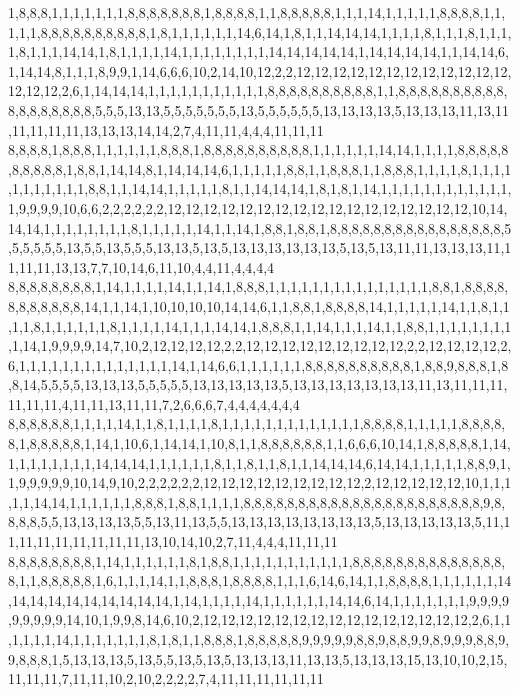 1,8,8,8,1,1,1,1,1,1,1,8,8,8,8,8,8,8,1,8,8,8,8,1,1,8,8,8,8,8,1,1,1,14,1,1,1,1,1,8,8,8,8,1,1,1,1,1,8,8,8,8,8,8,8,8,8,8,1,8,1,1,1,1,1,1,14,6,14,1,8,1,1,14,14,14,1,1,1,1,8,1,1,1,8,1,1,1,1,8,1,1,1,14,14,1,8,1,1,1,1,14,1,1,1,1,1,1,1,1,14,14,14,14,14,1,14,14,14,14,1,1,14,14,6,1,14,14,8,1,1,1,8,9,9,1,14,6,6,6,10,2,14,10,12,2,2,12,12,12,12,12,12,12,12,12,12,12,12,12,12,12,2,6,1,14,14,14,1,1,1,1,1,1,1,1,1,1,1,8,8,8,8,8,8,8,8,8,8,1,1,8,8,8,8,8,8,8,8,8,8,8,8,8,8,8,8,8,8,5,5,5,13,13,5,5,5,5,5,5,5,13,5,5,5,5,5,5,13,13,13,13,5,13,13,13,11,13,11,11,11,11,11,13,13,13,14,14,2,7,4,11,11,4,4,4,11,11,11
8,8,8,8,1,8,8,8,1,1,1,1,1,1,8,8,8,1,8,8,8,8,8,8,8,8,8,8,1,1,1,1,1,1,14,14,1,1,1,1,8,8,8,8,8,8,8,8,8,8,1,8,8,1,14,14,8,1,14,14,14,6,1,1,1,1,1,8,8,1,1,8,8,8,1,1,8,8,8,1,1,1,1,8,1,1,1,1,1,1,1,1,1,1,1,8,8,1,1,14,14,1,1,1,1,1,8,1,1,14,14,14,1,8,1,8,1,14,1,1,1,1,1,1,1,1,1,1,1,1,1,9,9,9,9,10,6,6,2,2,2,2,2,2,12,12,12,12,12,12,12,12,12,12,12,12,12,12,12,12,12,10,14,14,14,1,1,1,1,1,1,1,1,8,1,1,1,1,1,14,1,1,14,1,8,8,1,8,8,1,8,8,8,8,8,8,8,8,8,8,8,8,8,8,8,8,5,5,5,5,5,5,13,5,5,13,5,5,5,13,13,5,13,5,13,13,13,13,13,13,5,13,5,13,11,11,13,13,13,11,11,11,11,13,13,7,7,10,14,6,11,10,4,4,11,4,4,4,4
8,8,8,8,8,8,8,8,1,14,1,1,1,1,14,1,1,14,1,8,8,8,1,1,1,1,1,1,1,1,1,1,1,1,1,1,1,8,8,1,8,8,8,8,8,8,8,8,8,8,8,14,1,1,14,1,10,10,10,10,14,14,6,1,1,8,8,1,8,8,8,8,14,1,1,1,1,1,14,1,1,8,1,1,1,1,8,1,1,1,1,1,1,8,1,1,1,1,14,1,1,1,14,14,1,8,8,8,1,1,14,1,1,1,14,1,1,8,8,1,1,1,1,1,1,1,1,1,14,1,9,9,9,9,14,7,10,2,12,12,12,12,2,2,12,12,12,12,12,12,12,12,12,2,2,12,12,12,12,2,6,1,1,1,1,1,1,1,1,1,1,1,1,1,1,14,1,14,6,6,1,1,1,1,1,1,8,8,8,8,8,8,8,8,8,8,1,8,8,9,8,8,8,1,8,8,14,5,5,5,5,13,13,13,5,5,5,5,5,13,13,13,13,13,5,13,13,13,13,13,13,13,11,13,11,11,11,11,11,11,4,11,11,13,11,11,7,2,6,6,6,7,4,4,4,4,4,4,4
8,8,8,8,8,8,1,1,1,1,14,1,1,8,1,1,1,1,8,1,1,1,1,1,1,1,1,1,1,1,1,1,8,8,8,8,1,1,1,1,1,8,8,8,8,8,1,8,8,8,8,8,1,14,1,10,6,1,14,14,1,10,8,1,1,8,8,8,8,8,8,1,1,6,6,6,10,14,1,8,8,8,8,8,1,14,1,1,1,1,1,1,1,1,14,14,14,1,1,1,1,1,1,8,1,1,8,1,1,8,1,1,14,14,14,6,14,14,1,1,1,1,1,8,8,9,1,1,9,9,9,9,9,10,14,9,10,2,2,2,2,2,2,12,12,12,12,12,12,12,12,12,2,12,12,12,12,12,10,1,1,1,1,1,14,14,1,1,1,1,1,1,8,8,8,1,8,8,1,1,1,1,8,8,8,8,8,8,8,8,8,8,8,8,8,8,8,8,8,8,8,8,8,8,9,8,8,8,8,5,5,13,13,13,13,5,5,13,11,13,5,5,13,13,13,13,13,13,13,13,5,13,13,13,13,13,5,11,11,11,11,11,11,11,11,11,13,10,14,10,2,7,11,4,4,4,11,11,11
8,8,8,8,8,8,8,8,1,14,1,1,1,1,1,1,8,1,8,8,1,1,1,1,1,1,1,1,1,1,1,8,8,8,8,8,8,8,8,8,8,8,8,8,8,8,1,1,8,8,8,8,8,1,6,1,1,1,14,1,1,8,8,8,1,8,8,8,8,1,1,1,6,14,6,14,1,1,8,8,8,8,1,1,1,1,1,1,14,14,14,14,14,14,14,14,14,14,1,14,1,1,1,1,14,1,1,1,1,1,1,14,14,6,14,1,1,1,1,1,1,1,9,9,9,9,9,9,9,9,9,14,10,1,9,9,8,14,6,10,2,12,12,12,12,12,12,12,12,12,12,12,12,12,12,12,2,6,1,1,1,1,1,1,14,1,1,1,1,1,1,1,8,1,8,1,1,8,8,8,1,8,8,8,8,8,9,9,9,9,9,8,8,9,8,8,9,9,8,9,9,9,8,8,9,9,8,8,8,1,5,13,13,13,5,13,5,5,13,5,13,5,13,13,13,11,13,13,5,13,13,13,15,13,10,10,2,15,11,11,11,7,11,11,10,2,10,2,2,2,2,7,4,11,11,11,11,11,11
